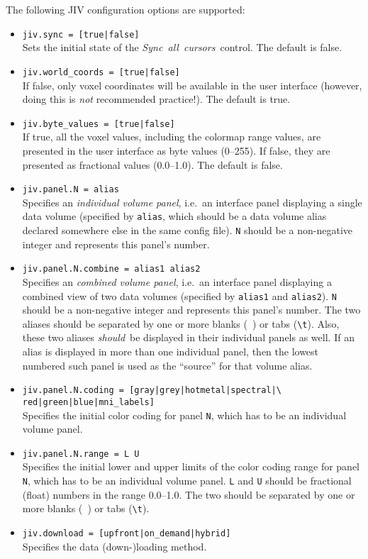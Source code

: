 The following JIV configuration options are supported:
\begin{itemize}
\item \verb+jiv.sync = [true|false]+ \\
  Sets the initial state of the \mbox{\em Sync all cursors}\ control.
  The default is false.
\item \verb+jiv.world_coords = [true|false]+ \\
  If false, only voxel coordinates will be available in the user
  interface (however, doing this is \emph{not} recommended practice!).
  The default is true.
\item \verb+jiv.byte_values = [true|false]+ \\
  If true, all the voxel values, including the colormap range values,
  are presented in the user interface as byte values (0--255). If
  false, they are presented as fractional values (0.0--1.0). The
  default is false.
\item \verb+jiv.panel.N = alias+ \\
  Specifies an {\em individual volume panel}, i.e.\ an interface panel
  displaying a single data volume (specified by \verb+alias+, which
  should be a data volume alias declared somewhere else in the same
  config file).  \verb+N+ should be a non-negative integer and
  represents this panel's number.
\item \verb+jiv.panel.N.combine = alias1 alias2+ \\
  Specifies an {\em combined volume panel}, i.e.\ an interface panel
  displaying a combined view of two data volumes (specified by
  \verb+alias1+ and \verb+alias2+). \verb+N+ should be a non-negative
  integer and represents this panel's number. The two aliases should
  be separated by one or more blanks (\verb*+ +) or tabs (\verb+\t+).
  Also, these two aliases {\em should}\ be displayed in their
  individual panels as well. If an alias is displayed in more than one
  individual panel, then the lowest numbered such panel is used as the
  ``source'' for that volume alias.
\item \verb+jiv.panel.N.coding = [gray|grey|hotmetal|spectral|\+ \\
      \verb+red|green|blue|mni_labels]+ \\
  Specifies the initial color coding for panel \verb+N+, which has to
  be an individual volume panel.
\item \verb+jiv.panel.N.range = L U+ \\
  Specifies the initial lower and upper limits of the color coding
  range for panel \verb+N+, which has to be an individual volume
  panel. \verb+L+ and \verb+U+ should be fractional (float) numbers in
  the range 0.0--1.0.  The two should be separated by one or more
  blanks (\verb*+ +) or tabs (\verb+\t+).
\item \verb+jiv.download = [upfront|on_demand|hybrid]+ \\
  Specifies the data (down-)loading method. 


\end{itemize}
